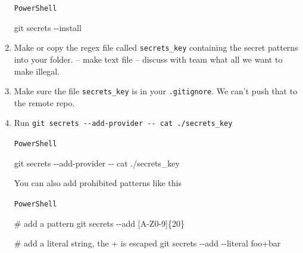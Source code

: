 \documentclass[
  letterpaper,
  DIV=11,
  numbers=noendperiod,
  oneside]{scrartcl}
\newenvironment{Shaded}{\begin{snugshade}}{\end{snugshade}}
\newcommand{\AttributeTok}[1]{\textcolor[rgb]{0.40,0.45,0.13}{#1}}
\newcommand{\CommentTok}[1]{\textcolor[rgb]{0.37,0.37,0.37}{#1}}
\newcommand{\FunctionTok}[1]{\textcolor[rgb]{0.28,0.35,0.67}{#1}}
\newcommand{\NormalTok}[1]{\textcolor[rgb]{0.00,0.23,0.31}{#1}}
\newcommand{\StringTok}[1]{\textcolor[rgb]{0.13,0.47,0.30}{#1}}
\begin{document}
\begin{enumerate}
  \begin{codelisting}

  \caption{\texttt{PowerShell}}

\begin{Shaded}
\begin{Highlighting}[]
\FunctionTok{git}\NormalTok{ secrets }\AttributeTok{{-}{-}install}
\end{Highlighting}
\end{Shaded}

  \end{codelisting}
\item
  Make or copy the regex file called \texttt{secrets\_key} containing
  the secret patterns into your folder. -- make text file -- discuss
  with team what all we want to make illegal.
\item
  Make sure the file \texttt{secrets\_key} is in your
  \texttt{.gitignore}. We can't push that to the remote repo.
\item
  Run \texttt{git\ secrets\ -\/-add-provider\ -\/-\ cat\ ./secrets\_key}

  \begin{codelisting}

  \caption{\texttt{PowerShell}}

\begin{Shaded}
\begin{Highlighting}[]
\FunctionTok{git}\NormalTok{ secrets }\AttributeTok{{-}{-}add{-}provider} \AttributeTok{{-}{-}}\NormalTok{ cat ./secrets\_key}
\end{Highlighting}
\end{Shaded}

  \end{codelisting}

  You can also add prohibited patterns like this

  \begin{codelisting}

  \caption{\texttt{PowerShell}}

\begin{Shaded}
\begin{Highlighting}[]
\CommentTok{\# add a pattern}
\FunctionTok{git}\NormalTok{ secrets }\AttributeTok{{-}{-}add} \StringTok{\textquotesingle{}[A{-}Z0{-}9]\{20\}\textquotesingle{}}

\CommentTok{\# add a literal string, the + is escaped}
\FunctionTok{git}\NormalTok{ secrets }\AttributeTok{{-}{-}add} \AttributeTok{{-}{-}literal} \StringTok{\textquotesingle{}foo+bar\textquotesingle{}}


\end{Highlighting}
\end{Shaded}
\end{codelisting}
\end{enumerate}
\end{document}
